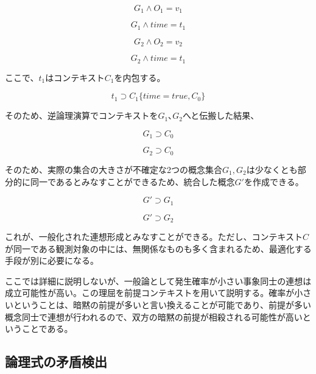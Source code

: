 \documentclass[12pt]{article}
\begin{document}
\begin{equation} G_1  \wedge O_1 = v_1\end{equation}

\begin{equation} G_1 \wedge time =t_1 \end{equation}

\begin{equation} G_2 \wedge O_2 = v_2\end{equation}

\begin{equation} G_2 \wedge time =t_1 \end{equation}

ここで、\(t_1\)はコンテキスト\(C_1\)を内包する。

\begin{equation}t_1 \supset C_1\{time=true,C_0\}\end{equation}

そのため、逆論理演算でコンテキストを\(G_1\)､\(G_2\)へと伝搬した結果、

\begin{equation} G_1 \supset C_0\end{equation}

\begin{equation} G_2 \supset C_0\end{equation}

そのため、実際の集合の大きさが不確定な2つの概念集合\(G_1,G_2\)は少なくとも部分的に同一であるとみなすことができるため、統合した概念\(G'\)を作成できる。

\begin{equation} G' \supset G_1 \end{equation}

\begin{equation} G' \supset G_2 \end{equation}

これが、一般化された連想形成とみなすことができる。ただし、コンテキスト\(C\)が同一である観測対象の中には、無関係なものも多く含まれるため、最適化する手段が別に必要になる。

ここでは詳細に説明しないが、一般論として発生確率が小さい事象同士の連想は成立可能性が高い。この理屈を前提コンテキストを用いて説明する。確率が小さいということは、暗黙の前提が多いと言い換えることが可能であり、前提が多い概念同士で連想が行われるので、双方の暗黙の前提が相殺される可能性が高いということである。

\subsection{論理式の矛盾検出}\label{ux8ad6ux7406ux5f0fux306eux77dbux76feux691cux51fa}
\end{document}

